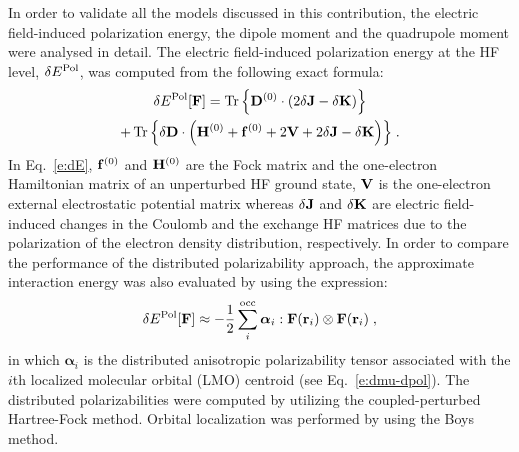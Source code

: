 \documentclass[aip,amsmath,amssymb,reprint,floatfix]{revtex4-1}
\newcommand{\tbraket}[3]{\ensuremath{\bigl\langle {#1} \bigl\lvert {#2} \bigl\lvert {#3} \bigr\rangle}}
\newcommand{\BM}[1]{\bm{#1}}
\DeclareMathOperator{\Tr}{Tr}
\begin{document}
In order to validate all the models discussed in this contribution,
the electric field\hyp{}induced polarization energy, 
the dipole moment and the quadrupole moment were analysed in detail.
The electric field\hyp{}induced polarization energy at the HF level, $\delta E^{\rm Pol}$,
was computed from the following exact formula:
%
\begin{multline}\label{e:dE}
 \delta E^{\rm Pol}[{\bf F}] = 
                     \Tr{\left\{ {\bf D}^{(0)} \cdot
                                \left( 2\delta {\bf J} - \delta {\bf K}  \right) \right\}} \\
                   + \Tr{\left\{ \delta {\bf D} \cdot
                                \left( {\bf H}^{(0)} + {\bf f}^{(0)} + 2{\bf V} + 2\delta {\bf J} - \delta {\bf K}\right) \right\}} \;.
\end{multline}
%
In Eq.~\eqref{e:dE}, ${\bf f}^{(0)}$ and ${\bf H}^{(0)}$ are the Fock matrix and 
the one\hyp{}electron Hamiltonian matrix of an unperturbed HF ground state,
${\bf V}$ is the one\hyp{}electron external electrostatic potential matrix whereas $\delta {\bf J}$
and $\delta {\bf K}$ are electric field\hyp{}induced changes in the Coulomb and the exchange HF matrices due to 
the polarization of the electron density distribution, respectively. 
In order to compare the performance of the distributed polarizability approach,
the approximate interaction energy was also evaluated by using the expression:
%
\begin{equation}\label{e:dE-dpol}
 \delta E^{\rm Pol}[{\bf F}] \approx %
                   - \frac{1}{2} \sum_i^{\rm occ} {\BM \alpha}_i : {\bf F}({\bf r}_i) \otimes {\bf F}({\bf r}_i) \;,
\end{equation}
%
in which ${\BM \alpha}_i$ is the distributed anisotropic polarizability tensor associated with the
$i$th localized molecular orbital (LMO) centroid (see Eq.~\eqref{e:dmu-dpol}).
The distributed polarizabilities were computed by utilizing the coupled\hyp{}perturbed Hartree\hyp{}Fock
method.\cite{McWeeny.RevModPhys.1960,Dodds.McWeeney.Sadlej.MolPhys.1977} 
Orbital localization was performed by using the Boys method.\cite{Boys.RevModPhys.1960} 
\end{document}
